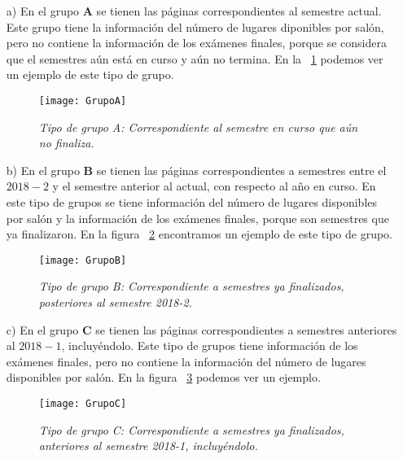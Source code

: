 \begin{enumerate}
\item[a)] En el grupo \textbf{A} se tienen las páginas correspondientes al semestre actual. Este grupo tiene la información del número de lugares diponibles por salón, pero no contiene la información de los exámenes finales, porque se considera que el semestres aún está en curso y aún no termina. En la \figurename{~\ref{GpoA}} podemos ver un ejemplo de este tipo de grupo.

\begin{figure}[H]
\centering
\texttt{[image: GrupoA]} %
\caption[\textit{Tipo de grupo A}]{\textit{Tipo de grupo A: Correspondiente al semestre en curso que aún no finaliza.}}\label{GpoA}
\end{figure}


\item[b)] En el grupo \textbf{B} se tienen las páginas correspondientes a semestres entre el $2018-2$ y el semestre anterior al actual, con respecto al año en curso. En este tipo de grupos se tiene información del número de lugares disponibles por salón y la información de los exámenes finales, porque son semestres que ya finalizaron. En la figura \figurename{~\ref{GpoB}} encontramos un ejemplo de este tipo de grupo.

\begin{figure}[H]
\centering
\texttt{[image: GrupoB]} %
\caption[\textit{Tipo de grupo B}]{\textit{Tipo de grupo B: Correspondiente a semestres ya finalizados, posteriores al semestre 2018-2.}}\label{GpoB}
\end{figure}

\item[c)] En el grupo \textbf{C} se tienen las páginas correspondientes a semestres anteriores al $2018-1$, incluyéndolo. Este tipo de grupos tiene información de los exámenes finales, pero no contiene la información del número de lugares disponibles por salón. En la figura \figurename{~\ref{GpoC}} podemos ver un ejemplo.

\begin{figure}[H]
\centering
\texttt{[image: GrupoC]} %
\caption[\textit{Tipo de grupo C}]{\textit{Tipo de grupo C: Correspondiente a semestres ya finalizados, anteriores al semestre 2018-1, incluyéndolo.}}\label{GpoC}
\end{figure}
\end{enumerate}


